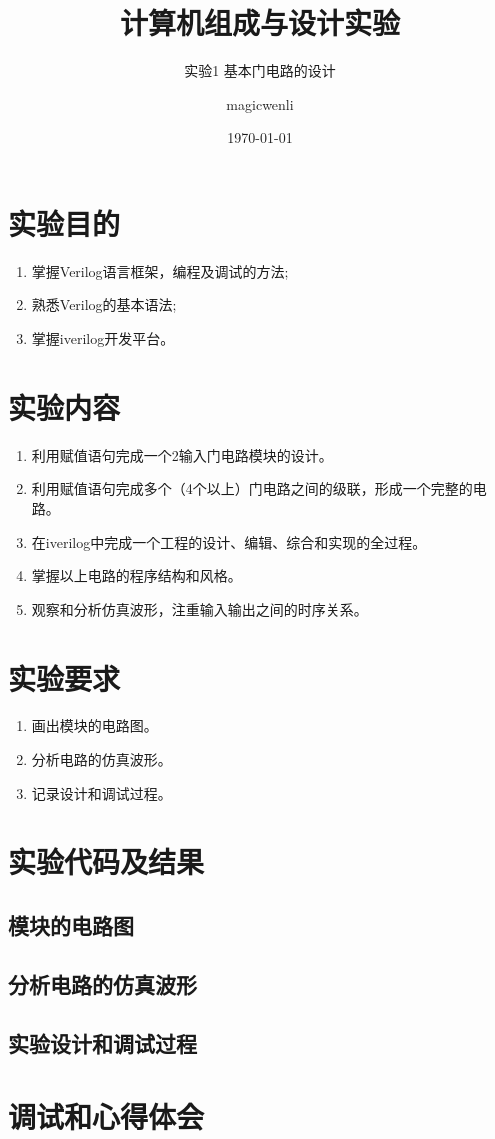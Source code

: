 \documentclass[14pt, b5paper, sourcefont]{qyxf-report-large}
\author{magicwenli}
\date{\today}
\title{计算机组成与设计实验}
\subtitle{实验1 基本门电路的设计}
\begin{document}
\maketitle
\tableofcontents


\section{实验目的}
\begin{enumerate}
	\item 掌握Verilog语言框架，编程及调试的方法;
	\item 熟悉Verilog的基本语法;
	\item 掌握iverilog开发平台。
\end{enumerate}

\section{实验内容}
\begin{enumerate}
	\item 利用赋值语句完成一个2输入门电路模块的设计。
	\item 利用赋值语句完成多个（4个以上）门电路之间的级联，形成一个完整的电路。
	\item 在iverilog中完成一个工程的设计、编辑、综合和实现的全过程。
	\item 掌握以上电路的程序结构和风格。
	\item 观察和分析仿真波形，注重输入输出之间的时序关系。
\end{enumerate}

\section{实验要求}
\begin{enumerate}
	\item 画出模块的电路图。
	\item 分析电路的仿真波形。
	\item 记录设计和调试过程。
\end{enumerate}

\section{实验代码及结果}
\subsection{模块的电路图}
\subsection{分析电路的仿真波形}
\subsection{实验设计和调试过程}

\section{调试和心得体会}
\end{document}
